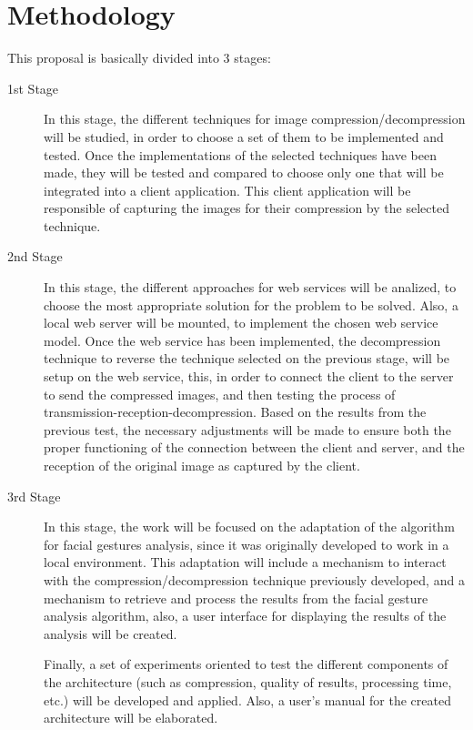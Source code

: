 \documentclass[12pt,letterpaper,titlepage]{article}
\begin{document}
\section{Methodology}
This proposal is basically divided into 3 stages:
\begin{description}
\item[1st Stage] In this stage, the different techniques for image compression/decompression will be studied, in order to choose a set of them to be implemented and tested. Once the implementations of the selected techniques have been made, they will be tested and compared to choose only one that will be integrated into a client application. This client application will be responsible of capturing the images for their compression by the selected technique.

\item[2nd Stage] In this stage, the different approaches for web services will be analized, to choose the most appropriate solution for the problem to be solved. Also, a local web server will be mounted, to implement the chosen web service model. Once the web service has been implemented, the decompression technique to reverse the technique selected on the previous stage, will be setup on the web service, this, in order to connect the client to the server to send the compressed images, and then testing the process of transmission-reception-decompression. Based on the results from the previous test, the necessary adjustments will be made to ensure both the proper functioning of the connection between the client and server, and the reception of the original image as captured by the client.

\item[3rd Stage] In this stage, the work will be focused on the adaptation of the algorithm for facial gestures analysis, since it was originally developed to work in a local environment. This adaptation will include a mechanism to interact with the compression/decompression technique previously developed, and a mechanism to retrieve and process the results from the facial gesture analysis algorithm, also, a user interface for displaying the results of the analysis will be created.

Finally, a set of experiments oriented to test the different components of the architecture (such as compression, quality of results, processing time, etc.) will be developed and applied. Also, a user's manual for the created architecture will be elaborated.
\end{description}

\clearpage
\end{document}
